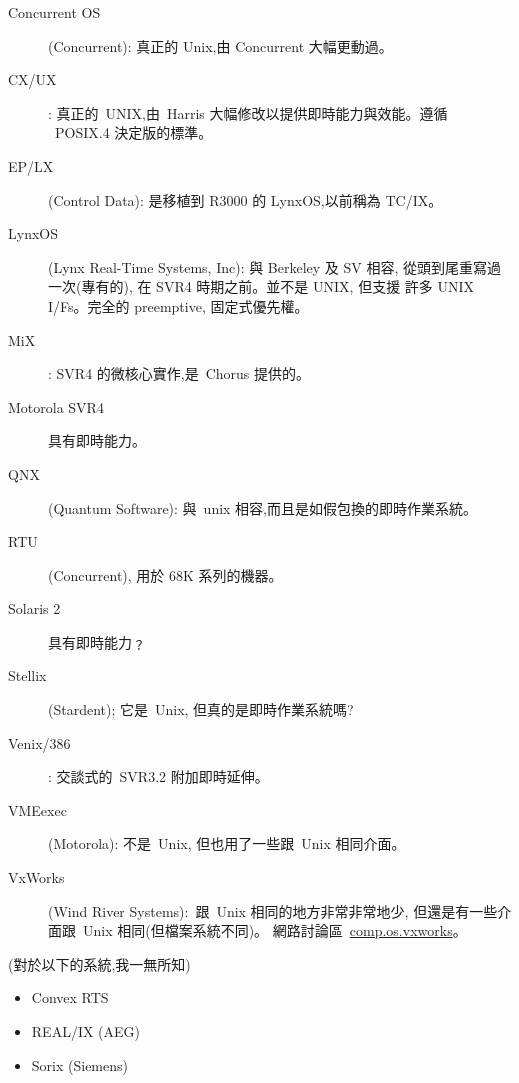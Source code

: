 \documentclass{article}
\begin{document}
\begin{CJK*}{Bg5}{ming}
\begin{description}
      \item [Concurrent OS] (Concurrent): 真正的 Unix,由 Concurrent 大幅更動過。

      \item [CX/UX]: 真正的~UNIX,由~Harris 大幅修改以提供即時能力與效能。遵循
             ~POSIX.4 決定版的標準。

      \item [EP/LX] (Control Data): 是移植到 R3000 的 LynxOS,以前稱為 TC/IX。

      \item [LynxOS] (Lynx Real-Time Systems, Inc): 與 Berkeley 及 SV 相容,
         從頭到尾重寫過一次(專有的), 在 SVR4 時期之前。並不是 UNIX, 但支援
         許多 UNIX I/Fs。完全的 preemptive, 固定式優先權。

      \item [MiX]: SVR4 的微核心實作,是~Chorus 提供的。

      \item [Motorola SVR4]具有即時能力。

      \item [QNX] (Quantum Software): 與~unix 相容,而且是如假包換的即時作業系統。

      \item [RTU] (Concurrent), 用於 68K 系列的機器。

      \item [Solaris 2] 具有即時能力﹖

      \item [Stellix] (Stardent); 它是~Unix, 但真的是即時作業系統嗎?

      \item [Venix/386]: 交談式的~SVR3.2 附加即時延伸。

      \item [VMEexec] (Motorola): 不是~Unix, 但也用了一些跟~Unix 相同介面。

      \item [VxWorks] (Wind River Systems):~跟~Unix 相同的地方非常非常地少,
         但還是有一些介面跟~Unix 相同(但檔案系統不同)。
         網路討論區~\url{comp.os.vxworks}。
\end{description}

        (對於以下的系統,我一無所知)
\begin{itemize}
      \item Convex RTS

      \item REAL/IX (AEG)

      \item Sorix (Siemens)


\end{itemize}
\end{CJK*}
\end{document}
